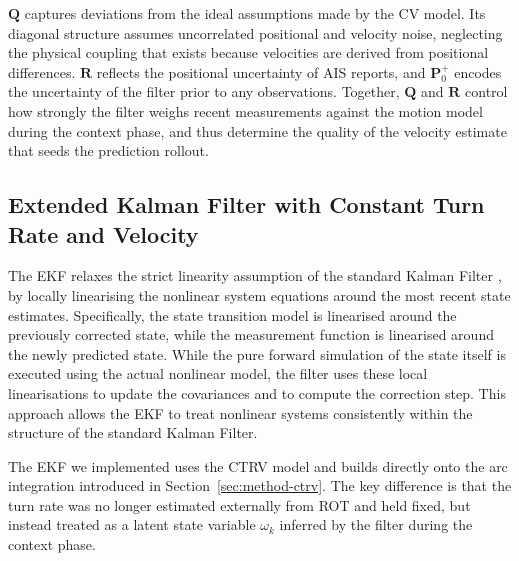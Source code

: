     $\mathbf{Q}$ captures deviations from the ideal assumptions made by the \ac{CV} model.
    Its diagonal structure assumes uncorrelated positional and velocity noise, neglecting the physical coupling that exists because velocities are derived from positional differences.
    $\mathbf{R}$ reflects the positional uncertainty of \ac{AIS}
    reports, and $\mathbf{P}^+_0$ encodes the uncertainty of the filter prior to any
    observations. Together, $\mathbf{Q}$ and $\mathbf{R}$ control how strongly the filter
    weighs recent measurements against the motion model during the context phase,
    and thus determine the quality of the velocity estimate that seeds the
    prediction rollout.


    \subsection{Extended Kalman Filter with Constant Turn Rate and Velocity}
    \label{sec:method-ctrv-ekf}
   The \acf{EKF} \parencite{Schmidt1966EKF} 
   relaxes the strict linearity assumption
   of the standard Kalman Filter%
, by locally linearising the nonlinear system equations around the most recent state estimates. Specifically, the state transition model is linearised around the previously corrected state, while the measurement function is linearised around the newly predicted state. While the pure forward simulation of the state itself is executed using the actual nonlinear model, the filter uses these local linearisations to update the covariances and to compute the correction step. This approach allows the \ac{EKF} to treat nonlinear systems consistently within the structure of the standard Kalman Filter. %


    
    The \ac{EKF} we implemented uses the \ac{CTRV} model and builds directly onto the arc integration
    introduced in Section~\ref{sec:method-ctrv}. The key difference is that the
    turn rate was no longer estimated externally from \ac{ROT} and held fixed, but
    instead treated as a latent state variable $\omega_k$ inferred by the filter during
    the context phase.


